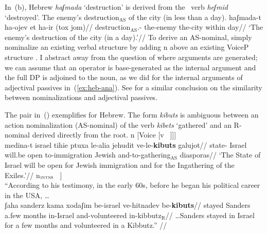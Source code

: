 	
In~(\nextx b), Hebrew \emph{haʃmada} `destruction' is derived from the \thif~verb \emph{heʃmid} `destroyed'.
\pex\label{ex:nom-destruct}
	\a The enemy's destruction$_{\text{AS}}$ of the city (in less than a day).
	\a \begingl
		\gla haʃmada-t ha-ojev et ha-ir (tox jom)//
		\glb destruction$_{\text{AS}}$.- the-enemy  the-city within day//
		\glft `The enemy's destruction of the city (in a day).'//
	\endgl
\xe
To derive an AS-nominal, simply nominalize an existing verbal structure by adding n above an existing VoiceP structure \citep{hazout95,engelhardt00}. I abstract away from the question of where arguments are generated; we can assume that an operator is base-generated as the internal argument and the full DP is adjoined to the noun, as we did for the internal arguments of adjectival passives in~(\ref{ex:heb-ana}). See \citet[559]{borer13oup} for a similar conclusion on the similarity between nominalizations and adjectival passives.
\\
\xe


The pair in~(\nextx) exemplifies for Hebrew. The form \emph{kibuts} is ambiguous between an action nominalization (AS-nominal) of the verb \emph{kibets} `gathered' and an R-nominal derived directly from the root.
\pex
	\a {[}n [Voice {\va} [v ~\!]]]\\
	\begingl
		\gla medina-t israel tihie ptuxa le-alia jehudit ve-le-\textbf{kibuts} galujot//
		\glb state- Israel will.be open to-immigration Jewish and-to-gathering$_{\text{AS}}$ diasporas//
		\glft `The State of Israel will be open for Jewish immigration and for the Ingathering of the Exiles.'//
	\endgl
	\a {[}n$_{\gsc{INTNS}}$ ~\!]\\
		``According to his testimony, in the early 60s, before he began his political career in the USA, \dots\\
	\begingl
		\gla ʃaha sanderz kama xodaʃim be-israel ve-hitnadev be-\textbf{kibuts}//
		\glb stayed Sanders a.few months in-Israel and-volunteered in-kibbutz$_{\text{R}}$//
		\glft \dots Sanders stayed in Israel for a few months and volunteered in a Kibbutz.''	//
	\endgl
\xe

